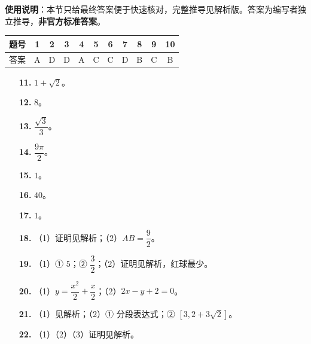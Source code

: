 
\begin{gknotice}
\textbf{使用说明}：本节只给最终答案便于快速核对，完整推导见解析版。答案为编写者独立推导，\textbf{非官方标准答案}。
\end{gknotice}

\begin{center}\begin{tabular}{ccccccccccc}
\toprule
题号 & 1 & 2 & 3 & 4 & 5 & 6 & 7 & 8 & 9 & 10 \\
\midrule
答案 & A & D & D & A & C & C & D & B & C & B \\
\bottomrule
\end{tabular}\end{center}

\begin{itemize}[leftmargin=2.6em]
  \item[\textbf{11.}] $1+\sqrt2$。
  \item[\textbf{12.}] $8$。
  \item[\textbf{13.}] $\dfrac{\sqrt3}3$。
  \item[\textbf{14.}] $\dfrac{9\pi}2$。
  \item[\textbf{15.}] $1$。
  \item[\textbf{16.}] $40$。
  \item[\textbf{17.}] $1$。
\end{itemize}

\begin{itemize}[leftmargin=2.6em]
  \item[\textbf{18.}] （1）证明见解析；（2）$AB=\dfrac92$。
  \item[\textbf{19.}] （1）① $5$；② $\dfrac32$；（2）证明见解析，红球最少。
  \item[\textbf{20.}] （1）$y=\dfrac{x^2}2+\dfrac x2$；（2）$2x-y+2=0$。
  \item[\textbf{21.}] （1）见解析；（2）① 分段表达式；② $\left[3,2+3\sqrt2\right]$。
  \item[\textbf{22.}] （1）（2）（3）证明见解析。
\end{itemize}
